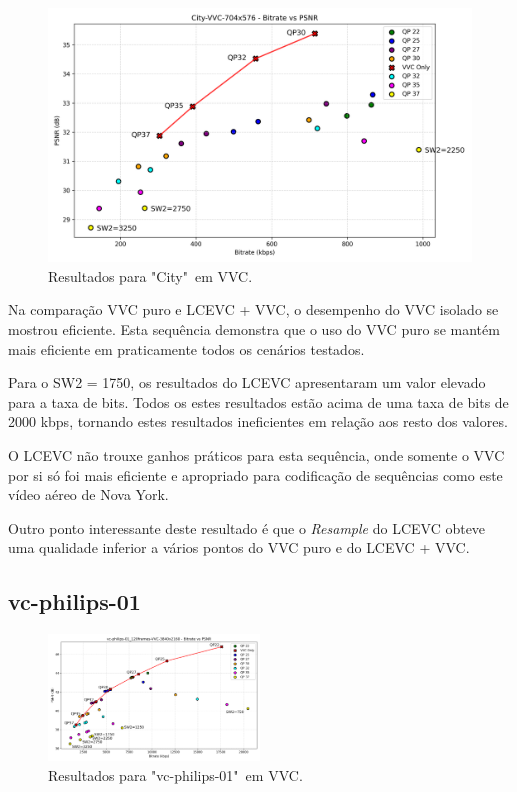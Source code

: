 \begin{figure}[h]
    \centering
    \includegraphics[width=1.0\textwidth]{img/City-VVC.png}
    \caption{Resultados para "City"\ em \acrshort{VVC}. \cite{xiph}}
    \label{fig:City-VVC}
\end{figure}

Na comparação \acrshort{VVC} puro e \acrshort{LCEVC} + \acrshort{VVC}, o desempenho
do \acrshort{VVC} isolado se mostrou eficiente. Esta sequência demonstra que o uso do
\acrshort{VVC} puro se mantém mais eficiente em praticamente todos os cenários testados.

Para o SW2 = 1750, os resultados do \acrshort{LCEVC} apresentaram um valor elevado para a 
taxa de bits. Todos os estes resultados estão acima de uma taxa de bits de 2000 kbps,
tornando estes resultados ineficientes em relação aos resto dos valores.


O \acrshort{LCEVC} não trouxe ganhos práticos para esta sequência, onde somente o
\acrshort{VVC} por si só foi mais eficiente e apropriado para codificação de sequências
como este vídeo aéreo de Nova York. 

Outro ponto interessante deste resultado é que o \textit{Resample} do \acrshort{LCEVC} obteve
uma qualidade inferior a vários pontos do \acrshort{VVC} puro e do \acrshort{LCEVC} + \acrshort{VVC}.


\newpage

\subsection{vc-philips-01}

\begin{figure}[h]
    \centering
    \includegraphics[width=0.5\textwidth]{img/vc-philips-01_120frames-VVC.png}
    \caption{Resultados para "vc-philips-01"\ em \acrshort{VVC}.}
    \label{fig:vc-philips-01-VVC}
\end{figure}

